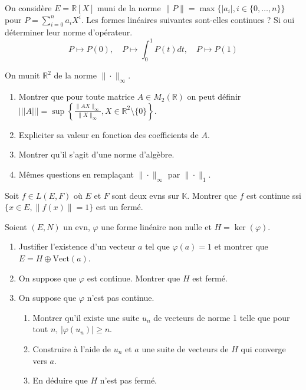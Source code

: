 \begin{exercice}
On considère $E=\mathbb{R}[X]$ muni de la norme $\|P\| = \max \{|a_{i}|, i \in \{0,\dots,n\}\}$ pour $P = \sum_{i=0}^{n} a_{i} X^{i}$.
Les formes linéaires suivantes sont-elles continues ? Si oui déterminer leur norme d'opérateur.
$$ P \mapsto P(0), \quad P \mapsto \int_{0}^{1} P(t) dt, \quad P \mapsto P(1) $$
\end{exercice}

\begin{exercice}
On munit $\mathbb{R}^{2}$ de la norme $\|\cdot\|_{\infty}$.
\begin{enumerate}
    \item Montrer que pour toute matrice $A \in M_{2}(\mathbb{R})$ on peut définir $|||A||| = \sup \left\{ \frac{\|AX\|_{\infty}}{\|X\|_{\infty}}, X \in \mathbb{R}^{2} \setminus \{0\} \right\}$.
    \item Expliciter sa valeur en fonction des coefficients de $A$.
    \item Montrer qu'il s'agit d'une norme d'algèbre.
    \item Mêmes questions en remplaçant $\|\cdot\|_{\infty}$ par $\|\cdot\|_{1}$.
\end{enumerate}
\end{exercice}

\begin{exercice}
Soit $f \in L(E,F)$ où $E$ et $F$ sont deux evns sur $\mathbb{K}$.
Montrer que $f$ est continue ssi $\{x \in E, \|f(x)\| = 1\}$ est un fermé.
\end{exercice}

\begin{exercice}
Soient $(E, N)$ un evn, $\varphi$ une forme linéaire non nulle et $H = \ker(\varphi)$.
\begin{enumerate}
    \item Justifier l'existence d'un vecteur $a$ tel que $\varphi(a)=1$ et montrer que $E = H \oplus \text{Vect}(a)$.
    \item On suppose que $\varphi$ est continue. Montrer que $H$ est fermé.
    \item On suppose que $\varphi$ n'est pas continue.
    \begin{enumerate}
        \item Montrer qu'il existe une suite $u_{n}$ de vecteurs de norme 1 telle que pour tout $n$, $|\varphi(u_{n})| \ge n$.
        \item Construire à l'aide de $u_{n}$ et $a$ une suite de vecteurs de $H$ qui converge vers $a$.
        \item En déduire que $H$ n'est pas fermé.
    \end{enumerate}
\end{enumerate}
\end{exercice}

